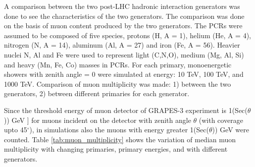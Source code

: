 \documentclass[12pt]{article}
\begin{document}
A comparison between the two post-LHC hadronic interaction generators was done to see the characteristics of the two generators. The comparison was done on the basis of muon content produced by the two generators. The PCRs were assumed to be composed of five species\cite{tanaka}, protons (H, A = 1), helium (He, A = 4), nitrogen (N, A = 14), aluminum (Al, A = 27) and iron (Fe, A = 56). Heavier nuclei N, Al and Fe were used to represent light (C,N,O), medium (Mg, Al, Si) and heavy (Mn, Fe, Co) masses in PCRs. For each primary, monoenergetic showers with zenith angle = 0 were simulated at energy: 10 TeV, 100 TeV, and 1000 TeV. Comparison of muon multiplicity was made: 1) between the two generators, 2) between different primaries for each generator.

Since the threshold energy of muon detector of GRAPES-3 experiment is 1(Sec($\theta$)) GeV ]\cite{hayashi} for muons incident on the detector with zenith angle $\theta$ (with coverage upto 45$^\circ$), in simulations also the muons with energy greater 1(Sec($\theta$)) GeV were counted. Table \ref{tab:muon_multiplicity} shows the variation of median muon multiplicity with changing primaries, primary energies, and with different generators. 
\end{document}
